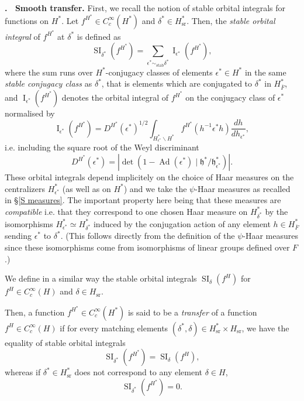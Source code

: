 \documentclass[12pt]{article}
\newenvironment{paragr}[1][]{\refstepcounter{subsubsection} \noindent \textbf{\thesubsubsection . \ #1}}{\medskip}
\numberwithin{equation}{section}
\DeclareMathOperator{\Ad}{Ad}
\DeclareMathOperator{\stab}{stab}
\DeclareMathOperator{\sr}{sr}
\DeclareMathOperator{\SI}{\mathrm{SI}}
\DeclareMathOperator{\rI}{\mathrm{I}}
\begin{document}
	\begin{paragr}[Smooth transfer.]
		First, we recall the notion of stable orbital integrals for functions on $H^*$. Let $f^{H^*}\in C_c^\infty(H^*)$ and $\delta^*\in H^*_{\sr}$. Then, the {\em stable orbital integral} of $f^{H^*}$ at $\delta^*$ is defined as
		$$\displaystyle \SI_{\delta^*}(f^{H^*})=\sum_{\epsilon^*\sim_{\stab} \delta^*} \rI_{\epsilon^*}(f^{H^*}),$$
		where the sum runs over $H^*$-conjugacy classes of elements $\epsilon^*\in H^*$ in the same {\em stable conjugacy class} as $\delta^*$, that is elements which are conjugated to $\delta^*$ in $H^*_{\overline{F}}$, and $\rI_{\epsilon^*}(f^{H^*})$ denotes the orbital integral of $f^{H^*}$ on the conjugacy class of $\epsilon^*$ normalised by
		$$\displaystyle \rI_{\epsilon^*}(f^{H^*})=D^{H^*}(\epsilon^*)^{1/2}\int_{H^*_{\epsilon^*}\backslash H^*} f^{H^*}({h}^{-1}\epsilon^* h) \frac{dh}{dh_{\epsilon^*}},$$
		i.e. including the square root of the Weyl discriminant
		$$\displaystyle D^{H^*}(\epsilon^*)=\left\lvert \det(1-\Ad(\epsilon^*)\mid \mathfrak{h}^*/\mathfrak{h}^*_{\epsilon^*})\right\rvert.$$
		These orbital integrals depend implicitely on the choice of Haar measures on the centralizers $H_{\epsilon^*}^*$ (as well as on $H^*$) and we take the $\psi$-Haar measures as recalled in \S \ref{S measures}. The important property here being that these measures are {\em compatible} i.e. that they correspond to one chosen Haar measure on $H^*_{\delta^*}$ by the isomorphisms $H^*_{\epsilon^*}\simeq H^*_{\delta^*}$ induced by the conjugation action of any element $h\in H^*_{\overline{F}}$ sending $\epsilon^*$ to $\delta^*$. (This follows directly from the definition of the $\psi$-Haar measures since these isomorphisms come from isomorphisms of linear groups defined over $F$.)
		
		We define in a similar way the stable orbital integrals $\SI_{\delta}(f^H)$ for $f^H\in C_c^\infty(H)$ and $\delta\in H_{\sr}$.
		
		Then, a function $f^{H^*}\in C_c^\infty(H^*)$ is said to be a {\em transfer} of a function $f^H\in C_c^\infty(H)$ if for every matching elements $(\delta^*,\delta)\in H^*_{\sr}\times H_{\sr}$, we have the equality of stable orbital integrals
		\begin{equation*}
			\displaystyle \SI_{\delta^*}(f^{H^*})=\SI_{\delta}(f^H),
		\end{equation*}
		whereas if $\delta^*\in H^*_{\sr}$ does not correspond to any element $\delta\in H$,
		\begin{equation*}
			\displaystyle \SI_{\delta^*}(f^{H^*})=0.
		\end{equation*}
		

\end{paragr}
\end{document}
